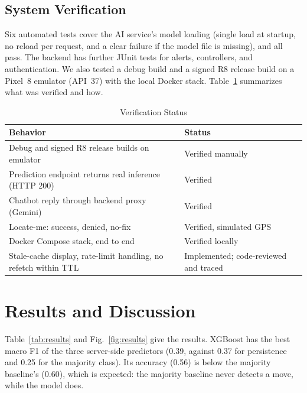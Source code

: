 \documentclass[conference]{IEEEtran}
\begin{document}
\subsection{System Verification}
Six automated tests cover the AI service's model loading (single load at startup, no reload per request, and a clear failure if the model file is missing), and all pass. The backend has further JUnit tests for alerts, controllers, and authentication. We also tested a debug build and a signed R8 release build on a Pixel~8 emulator (API~37) with the local Docker stack. Table~\ref{tab:verification} summarizes what was verified and how.

\begin{table}[t]
\caption{Verification Status}
\label{tab:verification}
\centering
\begin{tabular}{p{}p{}}
\toprule
\textbf{Behavior} & \textbf{Status}\\
\midrule
Debug and signed R8 release builds on emulator & Verified manually\\
Prediction endpoint returns real inference (HTTP 200) & Verified\\
Chatbot reply through backend proxy (Gemini) & Verified\\
Locate-me: success, denied, no-fix & Verified, simulated GPS\\
Docker Compose stack, end to end & Verified locally\\
Stale-cache display, rate-limit handling, no refetch within TTL & Implemented; code-reviewed and traced\\
\bottomrule
\end{tabular}
\end{table}

\section{Results and Discussion}
Table~\ref{tab:results} and Fig.~\ref{fig:results} give the results. XGBoost has the best macro F1 of the three server-side predictors (0.39, against 0.37 for persistence and 0.25 for the majority class). Its accuracy (0.56) is below the majority baseline's (0.60), which is expected: the majority baseline never detects a move, while the model does.
\end{document}
